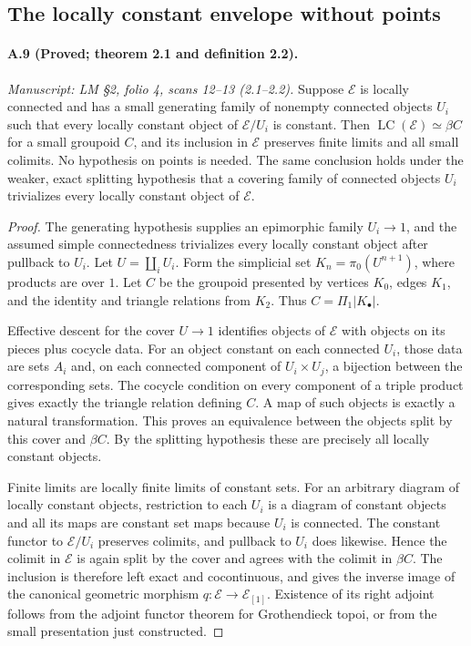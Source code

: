 \subsection{The locally constant envelope without points}

\paragraph{A.9 (Proved; theorem 2.1 and definition 2.2).}
\textit{Manuscript: LM \S2, folio 4, scans 12--13 (2.1--2.2).}
Suppose $\mathcal E$ is locally connected and has a small generating family of nonempty connected objects $U_i$ such that every locally constant object of $\mathcal E/U_i$ is constant. Then $\operatorname{LC}(\mathcal E)\simeq\beta C$ for a small groupoid $C$, and its inclusion in $\mathcal E$ preserves finite limits and all small colimits. No hypothesis on points is needed. The same conclusion holds under the weaker, exact splitting hypothesis that a covering family of connected objects $U_i$ trivializes every locally constant object of $\mathcal E$.
\begin{proof}
The generating hypothesis supplies an epimorphic family $U_i\to1$, and the assumed simple connectedness trivializes every locally constant object after pullback to $U_i$. Let $U=\coprod_iU_i$. Form the simplicial set $K_n=\pi_0(U^{n+1})$, where products are over $1$. Let $C$ be the groupoid presented by vertices $K_0$, edges $K_1$, and the identity and triangle relations from $K_2$. Thus $C=\Pi_1|K_\bullet|$.

Effective descent for the cover $U\to1$ identifies objects of $\mathcal E$ with objects on its pieces plus cocycle data. For an object constant on each connected $U_i$, those data are sets $A_i$ and, on each connected component of $U_i\times U_j$, a bijection between the corresponding sets. The cocycle condition on every component of a triple product gives exactly the triangle relation defining $C$. A map of such objects is exactly a natural transformation. This proves an equivalence between the objects split by this cover and $\beta C$. By the splitting hypothesis these are precisely all locally constant objects.

Finite limits are locally finite limits of constant sets. For an arbitrary diagram of locally constant objects, restriction to each $U_i$ is a diagram of constant objects and all its maps are constant set maps because $U_i$ is connected. The constant functor to $\mathcal E/U_i$ preserves colimits, and pullback to $U_i$ does likewise. Hence the colimit in $\mathcal E$ is again split by the cover and agrees with the colimit in $\beta C$. The inclusion is therefore left exact and cocontinuous, and gives the inverse image of the canonical geometric morphism $q:\mathcal E\to\mathcal E_{[1]}$. Existence of its right adjoint follows from the adjoint functor theorem for Grothendieck topoi, or from the small presentation just constructed. 
\end{proof}

